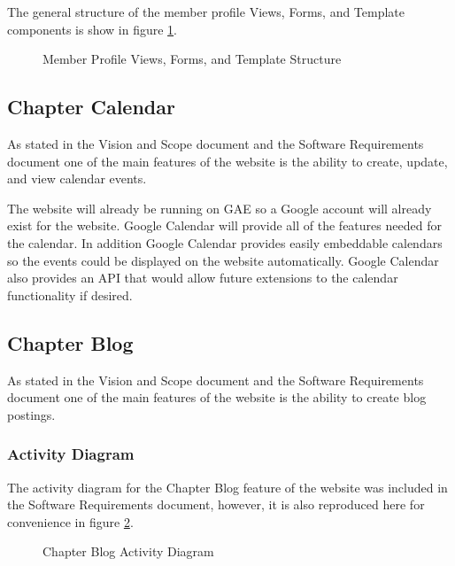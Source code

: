 \documentclass{article}
\begin{document}
The general structure of the member profile Views, Forms, and Template components is show in figure \ref{fig:memberProfileViewFormTemplateDiagram}.

\FloatBarrier
\begin{figure}[h!]
\centering
{}
\caption{Member Profile Views, Forms, and Template Structure}
\label{fig:memberProfileViewFormTemplateDiagram}
\end{figure}
\FloatBarrier

\subsection{Chapter Calendar}

As stated in the Vision and Scope document and the Software Requirements document one of the main features of the website is the ability to create, update, and view calendar events.

The website will already be running on GAE so a Google account will already exist for the website. Google Calendar will provide all of the features needed for the calendar. In addition Google Calendar provides easily embeddable calendars so the events could be displayed on the website automatically. Google Calendar also provides an API that would allow future extensions to the calendar functionality if desired.

\subsection{Chapter Blog}

As stated in the Vision and Scope document and the Software Requirements document one of the main features of the website is the ability to create blog postings.

\subsubsection{Activity Diagram}
The activity diagram for the Chapter Blog feature of the website was included in the Software Requirements document, however, it is also reproduced here for convenience in figure \ref{fig:blogActivityDiagram}.

\FloatBarrier
\begin{figure}[h!]
\centering
{}
\caption{Chapter Blog Activity Diagram}
\label{fig:blogActivityDiagram}
\end{figure}
\FloatBarrier
\end{document}
